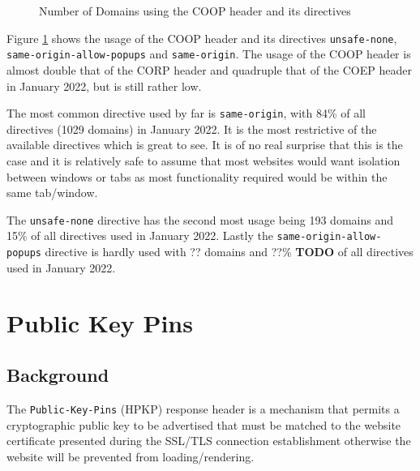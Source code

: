 \documentclass{mscreport}
\begin{document}
\begin{figure}[t]
	\begin{center}
		\caption{Number of Domains using the COOP header and its directives}
		\label{fig:coop_overview}
	\end{center}
\end{figure}

\noindent
Figure \ref{fig:coop_overview} shows the usage of the COOP header and its directives \texttt{unsafe-none}, \newline \texttt{same-origin-allow-popups} and \texttt{same-origin}. The usage of the COOP header is almost double that of the CORP header and quadruple that of the COEP header in January 2022, but is still rather low.

\vspace{0.3cm} \noindent
The most common directive used by far is \texttt{same-origin}, with 84\% of all directives (1029 domains) in January 2022. It is the most restrictive of the available directives which is great to see. It is of no real surprise that this is the case and it is relatively safe to assume that most websites would want isolation between windows or tabs as most functionality required would be within the same tab/window.

\vspace{0.3cm} \noindent
The \texttt{unsafe-none} directive has the second most usage being 193 domains and 15\% of all directives used in January 2022. Lastly the \texttt{same-origin-allow-popups} directive is hardly used with ?? domains and ??\% \textbf{TODO} of all directives used in January 2022.

\clearpage
\newpage


\section{Public Key Pins}
\label{section:hpkp}

\subsection{Background}

The \texttt{Public-Key-Pins} (HPKP) response header is a mechanism that permits a cryptographic public key to be advertised that must be matched to the website certificate presented during the SSL/TLS connection establishment otherwise the website will be prevented from loading/rendering.
\end{document}
